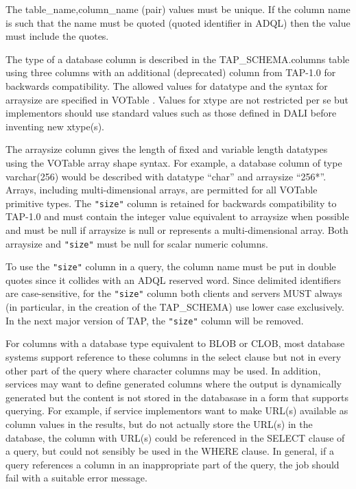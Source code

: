 \documentclass[11pt,letter]{ivoa}
\newcommand{\tapschema}{TAP\_SCHE\-MA}
\newcommand{\tapschema}{\mbox{%
  \relsize{-0.5}TAP\discretionary{-}{}{\kern-2pt\_}SCHEMA}}
\begin{document}
The table\_name,column\_name (pair) values must be unique. If the column name is such that 
the name must be quoted (quoted identifier in ADQL) then the value must include the quotes.

The type of a database column is described in the \tapschema.columns
table using three columns with an additional (deprecated) column from TAP-1.0 
for backwards compatibility. The allowed values for datatype and the syntax for arraysize
are specified in VOTable \citep{2013ivoa.spec.0920O}. Values for xtype are not restricted per se but 
implementors should use standard values such as those defined in DALI before 
inventing new xtype(s). 

The arraysize column gives the length of fixed and variable length datatypes using the VOTable
array shape syntax. For example, a database column of type varchar(256) would be 
described with datatype ``char'' and arraysize ``256*''. Arrays, including multi-dimensional 
arrays, are permitted for all VOTable primitive types. The \verb|"size"| column is retained for backwards
compatibility to TAP-1.0 and must contain the integer value equivalent to arraysize when 
possible and must be null if arraysize is null or represents a multi-dimensional array. Both arraysize 
and \verb|"size"| must be null for scalar numeric columns.

To use the \verb|"size"| column in a query, the column name must be put in double quotes since 
it collides with an ADQL reserved word. Since delimited identifiers are case-sensitive, for the 
\verb|"size"| column both
clients and servers MUST always (in particular, in the creation of the 
\tapschema) use lower case exclusively. In the next major version 
of TAP, the \verb|"size"| column will be removed.

For columns with a database type equivalent to BLOB or CLOB, most database systems support
reference to these columns in the select clause but not in every other part of the query where
character columns may be used. In addition, services may want to define generated columns where the output is dynamically generated but the content is not stored in the 
databasase in a form that supports querying. For example, if service implementors want to make
URL(s) available as column values in the results, but do not actually store the URL(s) in the
database, the column with URL(s) could be referenced in the SELECT clause of a query, but could
not sensibly be used in the WHERE clause. In general, if a query references a column in an 
inappropriate part of the query, the job should fail with a suitable error message.
\end{document}
